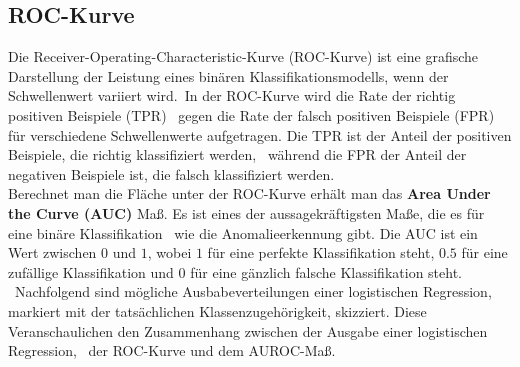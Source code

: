 \subsection{ROC-Kurve}\label{subsec:ROC-Kurve}
Die Receiver-Operating-Characteristic-Kurve (ROC-Kurve) ist eine grafische Darstellung der Leistung eines binären Klassifikationsmodells, wenn der Schwellenwert variiert wird.\ 
In der ROC-Kurve wird die Rate der richtig positiven Beispiele (TPR) \ 
gegen die Rate der falsch positiven Beispiele (FPR) für verschiedene Schwellenwerte aufgetragen. Die TPR ist der Anteil der positiven Beispiele, die richtig klassifiziert werden, \ 
während die FPR der Anteil der negativen Beispiele ist, die falsch klassifiziert werden. \\
Berechnet man die Fläche unter der ROC-Kurve erhält man das \textbf{\glqq Area Under the Curve\grqq{} (AUC)} Maß. Es ist eines der aussagekräftigsten Maße, die es für eine binäre Klassifikation \
wie die Anomalieerkennung gibt. Die AUC ist ein Wert zwischen $0$ und $1$, wobei $1$ für eine perfekte Klassifikation steht, $\num{0,5}$ für eine zufällige Klassifikation und $0$ für eine gänzlich falsche Klassifikation steht. \
Nachfolgend sind mögliche Ausbabeverteilungen einer logistischen Regression, markiert mit der tatsächlichen Klassenzugehörigkeit, skizziert. Diese Veranschaulichen den Zusammenhang zwischen der Ausgabe einer logistischen Regression, \
der ROC-Kurve und dem AUROC-Maß.
\newcommand{\thiswidth}{0.8\textwidth}

